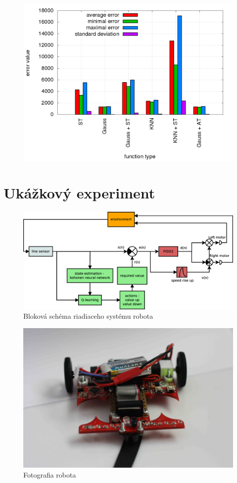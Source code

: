 \begin{figure}[!htb]
\centering
\includegraphics[scale=.4]{../../results_q_learning/map_3/trials_average_results.png}
\end{figure}


\section {Ukážkový experiment}

\begin{figure}[!htb]
\center
\includegraphics[scale=.3]{../diagrams/motoko_robot_block.eps}
\caption{Bloková schéma riadiaceho systému robota}
\label{img:motoko_block}
\end{figure}


\begin{figure}[!htb]
\center
\includegraphics[scale=.08]{../pictures/motoko_aftermath_front.jpg}
\caption{Fotografia robota}
\label{img:motoko_photo}
\end{figure}
